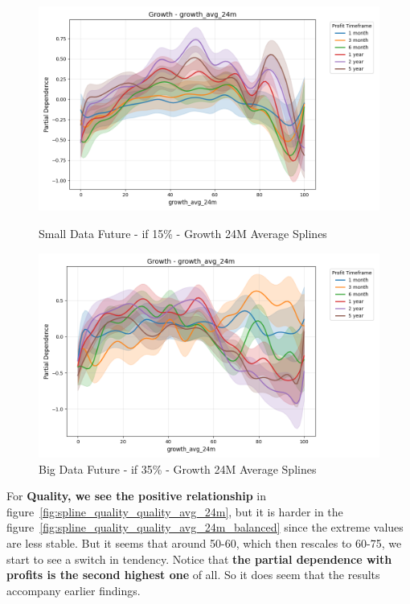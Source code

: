 \documentclass[11pt,english,a4paper,hidelinks]{book}
\begin{document}
\begin{figure}[H]
    \centering
    \begin{minipage}{0.48\textwidth}
        \centering
        \includegraphics[width=\textwidth]{images/code/models/general_regression/splines/2D/Small Data future - IF/growth_growth_avg_24m.png}
        \caption{Small Data Future - \acrshort{if} 15\% - Growth 24M Average Splines}
        \label{fig:spline_growth_growth_avg_12m}
    \end{minipage}\hfill
    \begin{minipage}{0.48\textwidth}
        \centering
        \includegraphics[width=\textwidth]{images/code/models/general_regression/splines/2D/Big Data future - IF HARD Balanced/growth_growth_avg_24m.png}
        \caption{Big Data Future - \acrshort{if} 35\% - Growth 24M Average Splines}
        \label{fig:spline_growth_growth_avg_12m_balanced}
    \end{minipage}
\end{figure}

\noindent For \textbf{Quality, we see the positive relationship} in figure~\ref{fig:spline_quality_quality_avg_24m}, but it is harder in the figure~\ref{fig:spline_quality_quality_avg_24m_balanced} since the extreme values are less stable. But it seems that around 50-60, which then rescales to 60-75, we start to see a switch in tendency. Notice that \textbf{the partial dependence with profits is the second highest one} of all. So it does seem that the results accompany earlier findings.
\end{document}
